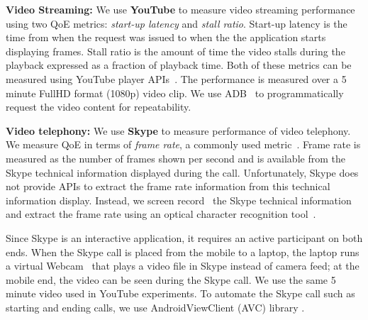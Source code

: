 \noindent\textbf{Video Streaming:} We use {\bf YouTube} to measure video streaming performance using two QoE metrics: {\em start-up latency} and {\em stall ratio}. 
Start-up latency is the time from when the request was issued to when the the application starts displaying frames. Stall ratio is the  amount of time the video stalls during the playback expressed as a fraction
of playback time.
Both of these metrics can be measured using YouTube player APIs~\cite{youtubeapi}. %
%
The performance is measured over a 5 minute FullHD format (1080p) video clip. We use ADB~\cite{adb} to programmatically request the video content for repeatability.%

\noindent\textbf{Video telephony:} We use {\bf Skype} to measure performance of video telephony. We measure QoE in terms of {\em frame rate}, a commonly used metric~\cite{yu2014can}.
Frame rate is measured as the number of frames shown per second and is available from the Skype technical information displayed during the call. Unfortunately, Skype does not provide APIs to extract the frame rate information from this technical information display.
Instead, we screen record~\cite{azscreen} the Skype technical information and extract the frame rate using an optical character recognition tool~\cite{ocr-tesseract}. 

Since Skype is an interactive application, it requires an active participant on both ends. When the Skype call is placed from the mobile to a laptop, the laptop runs a virtual Webcam~\cite{mancam} that plays a video file in Skype instead of camera feed; at the mobile end, the video can be seen during the Skype call. 
We use the same 5 minute video used in YouTube experiments. To automate the Skype call such as starting and ending calls, we use AndroidViewClient (AVC) library \cite{awc}. 

